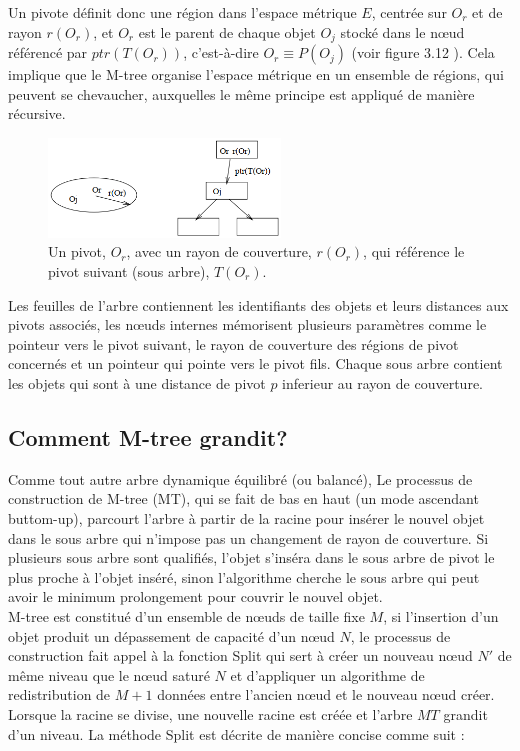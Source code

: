 Un pivote définit donc une région dans l'espace métrique $ E $, centrée sur $ O_r $ et de rayon $ r(O_r) $, et $ O_r $ est le parent de chaque objet $ O_j $ stocké dans le nœud référencé par $ ptr(T(O_r)) $, c'est-à-dire $ O_r \equiv P(O_j)$ (voir figure 3.12 ).  Cela implique que le M-tree organise l'espace métrique en un ensemble de régions, qui peuvent se chevaucher, auxquelles le même principe est appliqué de manière récursive.

\begin{figure}[H]
	\centering
	\includegraphics[width=0.55\textwidth]{Figures/mtree.png} %
	\caption{ Un pivot, $ O_r $, avec un rayon de couverture, $  r(O_r) $, qui référence le pivot suivant (sous arbre), $ T(O_r) $.}
\end{figure}

Les feuilles de l’arbre contiennent les identifiants des objets et leurs distances aux pivots associés, les nœuds internes mémorisent plusieurs paramètres comme le pointeur vers le pivot suivant, le rayon de couverture des régions de pivot concernés et un pointeur qui pointe vers le pivot fils. Chaque sous arbre contient les objets qui sont à une distance de pivot $ p $ inferieur au rayon de couverture.\\

\subsection{Comment M-tree grandit?}

Comme tout autre arbre dynamique équilibré (ou balancé), Le processus de construction de M-tree (MT), qui se fait de bas en haut (un mode ascendant buttom-up), parcourt l'arbre à partir de la racine pour insérer le nouvel objet dans le sous arbre qui n'impose pas un changement de rayon de couverture. Si plusieurs sous arbre sont qualifiés, l'objet s'inséra dans le sous arbre de pivot le plus proche à l'objet inséré, sinon l'algorithme cherche le sous arbre qui peut avoir le minimum prolongement pour couvrir le nouvel objet.\\

M-tree est constitué d’un ensemble de nœuds de taille fixe $ M $, si l'insertion d'un objet produit un dépassement de capacité d'un nœud $ N $, le processus de construction fait appel à la fonction Split qui sert à créer un nouveau nœud $ N' $ de même niveau que le nœud saturé $ N  $ et d’appliquer un algorithme de redistribution de $ M+1 $ données entre l’ancien nœud et le nouveau nœud créer. Lorsque la racine se divise, une nouvelle racine est créée et l'arbre $ MT $ grandit d'un niveau. La méthode Split est décrite de manière concise comme suit :\\

